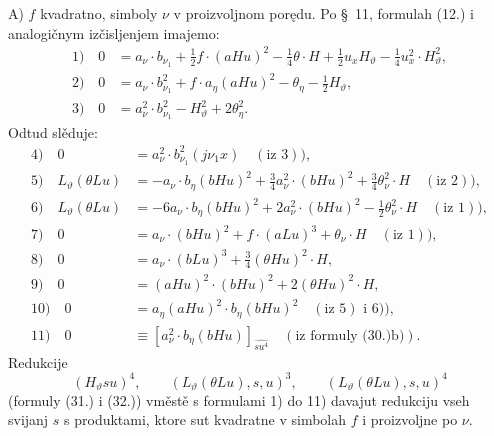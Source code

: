 \documentclass[11pt]{article}
\begin{document}
\mbox{A)} $f$ kvadratno, simboly $\nu$ v proizvoljnom porędu. Po \S\ 11, formulah (12.) i analogičnym izčisljenjem imajemo:
\begin{align*}
1)\quad 0&=a_\nu\cdot b_{\nu_1}+\frac12f\cdot(aHu)^2-\frac14\theta\cdot H+\frac12u_xH_\vartheta-\frac14u_x^2\cdot H_\vartheta^2,\\
2)\quad 0&=a_\nu\cdot b_{\nu_1}^2+f\cdot a_\eta(aHu)^2-\theta_\eta-\frac12H_\vartheta,\\
3)\quad 0&=a_\nu^2\cdot b_{\nu_1}^2-H_\vartheta^2+2\theta_\eta^2.
\end{align*}
Odtud slěduje:
\begin{align*}
4)\quad 0&=a_\nu^2\cdot b_{\nu_1}^2(j\nu_1x)\quad(\text{iz }3)),\\
5)\quad L_\vartheta(\theta Lu)&=-a_\nu\cdot b_\eta(bHu)^2+\frac34a_\nu^2\cdot(bHu)^2+\frac34\theta_\nu^2\cdot H\quad(\text{iz }2)),\\
6)\quad L_\vartheta(\theta Lu)&=-6a_\nu\cdot b_\eta(bHu)^2+2a_\nu^2\cdot(bHu)^2-\frac12\theta_\nu^2\cdot H\quad(\text{iz }1)),\\
7)\quad 0&=a_\nu\cdot(bHu)^2+f\cdot(aLu)^3+\theta_\nu\cdot H\quad(\text{iz }1)),\\
8)\quad 0&=a_\nu\cdot(bLu)^3+\frac34(\theta Hu)^2\cdot H,\\
9)\quad 0&=(aHu)^2\cdot(bHu)^2+2(\theta Hu)^2\cdot H,\\
10)\quad 0&=a_\eta(aHu)^2\cdot b_\eta(bHu)^2\quad(\text{iz }5)\text{ i }6)),\\
11)\quad 0&\equiv [a_\nu^2\cdot b_\eta(bHu)]_{\widehat{su^4}}\quad(\text{iz formuly (30.)b)}).
\end{align*}
Redukcije
\[
(H_\vartheta su)^4,
\qquad (L_\vartheta(\theta Lu),s,u)^3,
\qquad (L_\vartheta(\theta Lu),s,u)^4
\]
(formuly (31.) i (32.)) vměstě s formulami 1) do 11) davajut redukciju vseh svijanj $s$ s produktami, ktore sut kvadratne v simbolah $f$ i proizvoljne po $\nu$.
\end{document}
